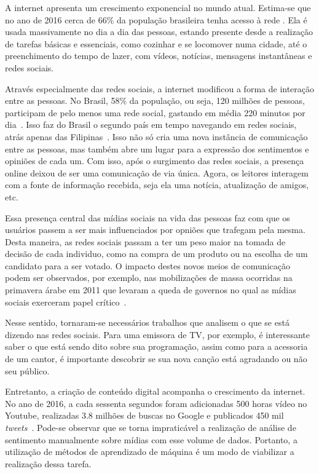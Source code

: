 
A internet apresenta um crescimento exponencial no mundo atual.
Estima-se que no ano de 2016 cerca de 66\% da população brasileira tenha acesso à rede \cite{social17}.
Ela é usada massivamente no dia a dia das pessoas, estando presente desde a realização de tarefas básicas e essenciais,
como cozinhar e se locomover numa cidade, até o preenchimento do tempo de lazer, com vídeos, notícias, mensagens
instantâneas e redes sociais.

Através especialmente das redes sociais, a internet modificou a forma de interação entre as pessoas.
No Brasil, 58\% da população, ou seja, 120 milhões de pessoas, participam de pelo menos uma rede social, gastando em
média 220 minutos por dia~\cite{social17}.
Isso faz do Brasil o segundo país em tempo navegando em redes sociais, atrás apenas das Filipinas~\cite{social17}.
Isso não só cria uma nova instância de comunicação entre as pessoas, mas também abre um lugar para a expressão dos
sentimentos e opiniões de cada um.
Com isso, após o surgimento das redes sociais, a presença online deixou de ser uma comunicação de via única.
Agora, os leitores interagem com a fonte de informação recebida, seja ela uma notícia, atualização de amigos, etc.

Essa presença central das mídias sociais na vida das pessoas faz com que os usuários passem a ser mais influenciados
por opniões que trafegam pela mesma.
Desta maneira, as redes sociais passam a ter um peso maior na tomada de decisão de cada individuo, como na compra de
um produto ou na escolha de um candidato para a ser votado.
O impacto destes novos meios de comunicação podem ser observados, por exemplo, nas mobilizações de massa ocorridas na
primavera árabe em 2011 que levaram a queda de governos no qual as mídias sociais exerceram papel
crítico~\cite{mourtada11}.

Nesse sentido, tornaram-se necessários trabalhos que analisem o que se está dizendo nas redes sociais.
Para uma emissora de TV, por exemplo, é interessante saber o que está sendo dito sobre sua programação, assim como para
a acessoria de um cantor, é importante descobrir se sua nova canção está agradando ou não seu público.

Entretanto, a criação de conteúdo digital acompanha o crescimento da internet.
No ano de 2016, a cada sessenta segundos foram adicionadas 500 horas vídeo no Youtube, realizadas 3.8 milhões de buscas
no Google e publicados 450 mil \textit{tweets}~\cite{smartinsights}.
Pode-se observar que se torna impraticável a realização de análise de sentimento manualmente sobre mídias com esse volume
de dados.
Portanto, a utilização de métodos de aprendizado de máquina é um modo de viabilizar a realização dessa tarefa.

